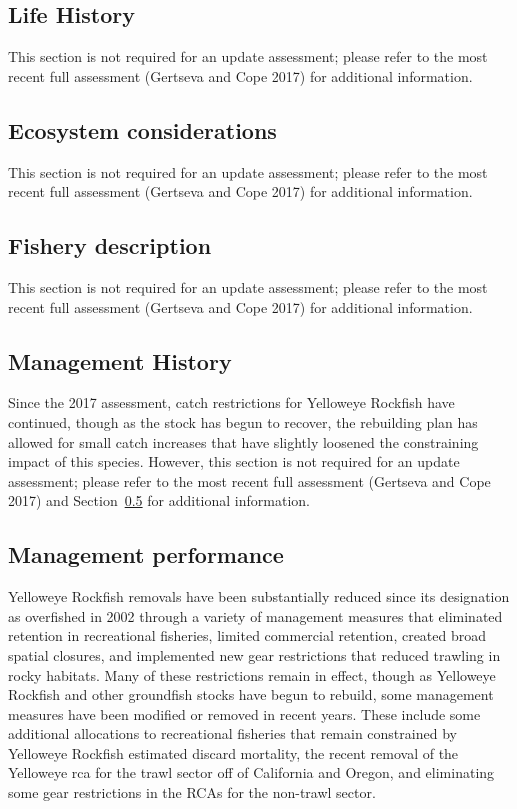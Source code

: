 \documentclass[
]{scrartcl}
\begin{document}
\subsection{Life History}\label{life-history}

This section is not required for an update assessment; please refer to
the most recent full assessment (Gertseva and Cope 2017) for additional
information.

\subsection{Ecosystem considerations}\label{ecosystem-considerations-1}

This section is not required for an update assessment; please refer to
the most recent full assessment (Gertseva and Cope 2017) for additional
information.

\subsection{Fishery description}\label{fishery-description}

This section is not required for an update assessment; please refer to
the most recent full assessment (Gertseva and Cope 2017) for additional
information.

\subsection{Management History}\label{management-history}

Since the 2017 assessment, catch restrictions for Yelloweye Rockfish
have continued, though as the stock has begun to recover, the rebuilding
plan has allowed for small catch increases that have slightly loosened
the constraining impact of this species. However, this section is not
required for an update assessment; please refer to the most recent full
assessment (Gertseva and Cope 2017) and Section~\ref{sec-mgmt} for
additional information.

\subsection{Management performance}\label{sec-mgmt}

Yelloweye Rockfish removals have been substantially reduced since its
designation as overfished in 2002 through a variety of management
measures that eliminated retention in recreational fisheries, limited
commercial retention, created broad spatial closures, and implemented
new gear restrictions that reduced trawling in rocky habitats. Many of
these restrictions remain in effect, though as Yelloweye Rockfish and
other groundfish stocks have begun to rebuild, some management measures
have been modified or removed in recent years. These include some
additional allocations to recreational fisheries that remain constrained
by Yelloweye Rockfish estimated discard mortality, the recent removal of
the Yelloweye \gls{rca} for the trawl sector off of California and
Oregon, and eliminating some gear restrictions in the RCAs for the
non-trawl sector.
\end{document}
